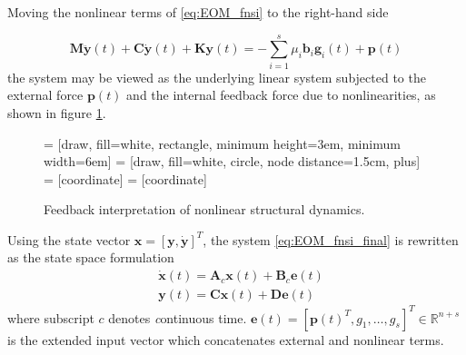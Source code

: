 Moving the nonlinear terms of \eqref{eq:EOM_fnsi} to the right-hand side

\begin{equation}
  \label{eq:EOM_fnsi_final}
  \bm M \ddot{\bm y}(t) + \bm C \dot{\bm y}(t) + \bm K \bm y(t) = -
  \sum_{i=1}^s \mu_i \bm b_i \bm g_i(t) + \bm p(t)
\end{equation}
the system may be viewed as the underlying linear system subjected to the
external force $\bm p(t)$ and the internal feedback force due to nonlinearities,
as shown in figure \ref{fig:fnsi_feedback}.

\begin{figure}[!ht]
  \centering
   = [draw, fill=white, rectangle, minimum height=3em, minimum width=6em]
   = [draw, fill=white, circle, node distance=1.5cm, plus]
   = [coordinate]
   = [coordinate]
  \caption{Feedback interpretation of nonlinear structural dynamics.}
  \label{fig:fnsi_feedback}
\end{figure}


Using the state vector $\bm x = [\bm y, \dot{\bm y}]^T$, the system
\eqref{eq:EOM_fnsi_final} is rewritten as the state space formulation
\begin{equation}
  \label{eq:fnsi_c_state_space}
  \begin{split}
    &\dot{\bm x}(t) = \bm A_c \bm x(t) + \bm B_c \bm e(t) \\
    &\bm y(t) = \bm C \bm x(t) + \bm D \bm e(t)
  \end{split}
\end{equation}
where subscript $c$ denotes {\textit continuous time}. $\bm e(t) =
[\bm p(t)^T, g_1, \dots , g_s]^T \in \mathbb{R}^{n+s}$ is the extended input
vector which concatenates external and nonlinear terms.

